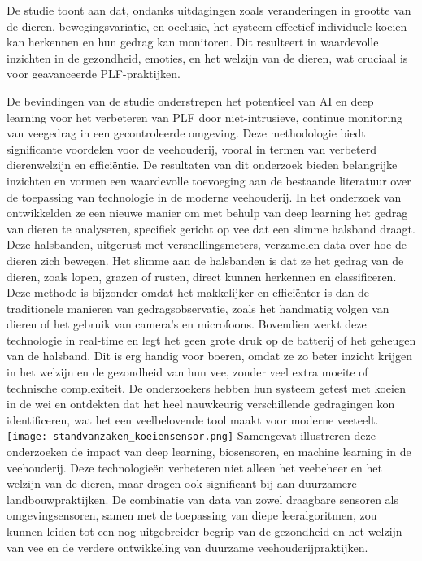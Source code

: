 De studie toont aan dat, ondanks uitdagingen zoals veranderingen in grootte van de dieren, bewegingsvariatie, en occlusie, het systeem effectief individuele koeien kan herkennen en hun gedrag kan monitoren. Dit resulteert in waardevolle inzichten in de gezondheid, emoties, en het welzijn van de dieren, wat cruciaal is voor geavanceerde PLF-praktijken.

De bevindingen van de studie onderstrepen het potentieel van AI en deep learning voor het verbeteren van PLF door niet-intrusieve, continue monitoring van veegedrag in een gecontroleerde omgeving. Deze methodologie biedt significante voordelen voor de veehouderij, vooral in termen van verbeterd dierenwelzijn en efficiëntie. De resultaten van dit onderzoek bieden belangrijke inzichten en vormen een waardevolle toevoeging aan de bestaande literatuur over de toepassing van technologie in de moderne veehouderij.
\newline
In het onderzoek van \textcite{ar5iv2021} ontwikkelden ze een nieuwe manier om met behulp van deep learning het gedrag van dieren te analyseren, specifiek gericht op vee dat een slimme halsband draagt. Deze halsbanden, uitgerust met versnellingsmeters, verzamelen data over hoe de dieren zich bewegen. Het slimme aan de halsbanden is dat ze het gedrag van de dieren, zoals lopen, grazen of rusten, direct kunnen herkennen en classificeren.
Deze methode is bijzonder omdat het makkelijker en efficiënter is dan de traditionele manieren van gedragsobservatie, zoals het handmatig volgen van dieren of het gebruik van camera’s en microfoons. Bovendien werkt deze technologie in real-time en legt het geen grote druk op de batterij of het geheugen van de halsband. Dit is erg handig voor boeren, omdat ze zo beter inzicht krijgen in het welzijn en de gezondheid van hun vee, zonder veel extra moeite of technische complexiteit. De onderzoekers hebben hun systeem getest met koeien in de wei en ontdekten dat het heel nauwkeurig verschillende gedragingen kon identificeren, wat het een veelbelovende tool maakt voor moderne veeteelt.
\newline
\newline
\texttt{[image: standvanzaken\_koeiensensor.png]}
\newline
\newline
Samengevat illustreren deze onderzoeken de impact van deep learning, biosensoren, en machine learning in de veehouderij. 
Deze technologieën verbeteren niet alleen het veebeheer en het welzijn van de dieren, maar dragen ook significant bij aan duurzamere landbouwpraktijken. 
De combinatie van data van zowel draagbare sensoren als omgevingsensoren, samen met de toepassing van diepe leeralgoritmen, zou kunnen leiden tot een nog uitgebreider begrip van de gezondheid en het welzijn van vee en de verdere ontwikkeling van duurzame veehouderijpraktijken.
